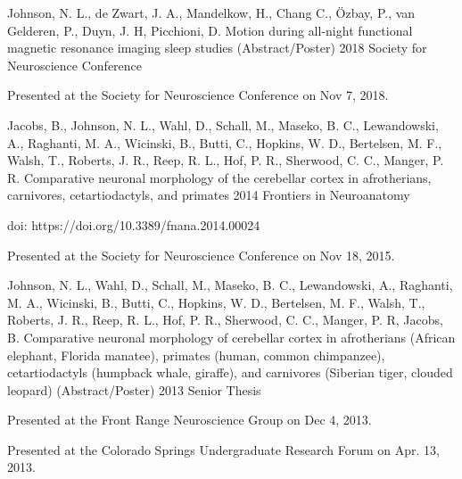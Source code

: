 \begin{cventries}
  \cventry
  {Johnson, N. L., de Zwart, J. A., Mandelkow, H., Chang C., Özbay, P., van Gelderen, P., Duyn, J. H, Picchioni, D.} %
  {Motion during all-night functional magnetic resonance imaging sleep studies (Abstract/Poster)} %
  {2018} %
  {Society for Neuroscience Conference} %
  {
    \begin{cvitems} %
    \item {Presented at the Society for Neuroscience Conference on Nov 7, 2018.}
    \end{cvitems}
  }
    
  
  \cventry
    {Jacobs, B., Johnson, N. L., Wahl, D., Schall, M., Maseko, B. C., Lewandowski, A., Raghanti, M. A., Wicinski, B., Butti, C., Hopkins, W. D., Bertelsen, M. F., Walsh, T., Roberts, J. R., Reep, R. L., Hof, P. R., Sherwood, C. C., Manger, P. R.} %
    {Comparative neuronal morphology of the cerebellar cortex in afrotherians, carnivores, cetartiodactyls, and primates} %
    {2014} %
    {Frontiers in Neuroanatomy} %
    {
      \begin{cvitems} %
        \item {doi: https://doi.org/10.3389/fnana.2014.00024}
        \item {Presented at the Society for Neuroscience Conference on Nov 18, 2015.}
      \end{cvitems}
    }
      \cventry
    {Johnson, N. L., Wahl, D., Schall, M., Maseko, B. C., Lewandowski, A., Raghanti, M. A., Wicinski, B., Butti, C., Hopkins, W. D., Bertelsen, M. F., Walsh, T., Roberts, J. R., Reep, R. L., Hof, P. R., Sherwood, C. C., Manger, P. R, Jacobs, B.} %
    { Comparative neuronal morphology of cerebellar cortex in afrotherians (African elephant, Florida manatee), primates (human, common chimpanzee), cetartiodactyls (humpback whale, giraffe), and carnivores (Siberian tiger, clouded leopard) (Abstract/Poster)} %
    {2013} %
    {Senior Thesis} %
    {
      \begin{cvitems} %
        \item {Presented at the Front Range Neuroscience Group on Dec 4, 2013.}
        \item {Presented at the Colorado Springs Undergraduate Research Forum on Apr. 13, 2013.}
      \end{cvitems}
    }


\end{cventries}
